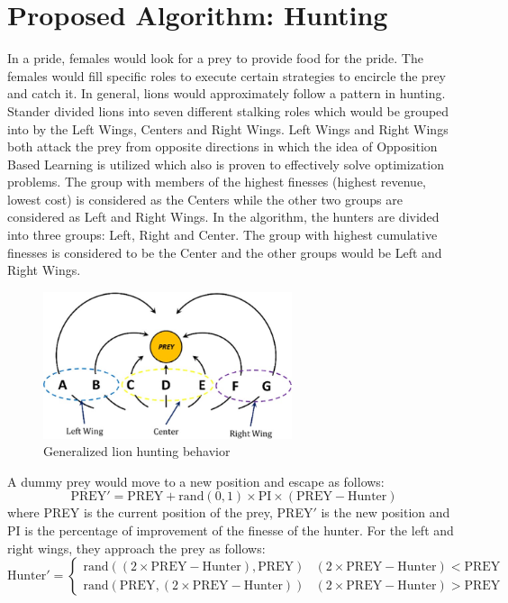 \section{Proposed Algorithm: Hunting}
In a pride, females would look for a prey to provide food for the pride. The females would fill specific roles to execute certain strategies to encircle the prey and catch it. In general, lions would approximately follow a pattern in hunting. Stander divided lions into seven different stalking roles which would be grouped into by the Left Wings, Centers and Right Wings.
Left Wings and Right Wings both attack the prey from opposite directions in which the idea of Opposition Based Learning is utilized which also is proven to effectively solve optimization problems.
The group with members of the highest finesses (highest revenue, lowest cost) is considered as the Centers while the other two groups are considered as Left and Right Wings.
In the algorithm, the hunters are divided into three groups: Left, Right and Center. The group with highest cumulative finesses is considered to be the Center and the other groups would be Left and Right Wings.
\begin{figure}[h]
\begin{center}
\includegraphics[width=0.65\textwidth]{img/pa/hunting_scheme}
\caption{Generalized lion hunting behavior}
\end{center}
\end{figure}
A dummy prey would move to a new position and escape as follows:
$$\text{PREY}' = \text{PREY} + \text{rand}(0,1) \times \text{PI} \times (\text{PREY} - \text{Hunter})$$
where PREY is the current position of the prey, PREY$'$ is the new position and PI is the percentage of improvement of the finesse of the hunter.
For the left and right wings, they approach the prey as follows:
\[ \text{Hunter}' =  \begin{cases} 
      \text{rand}((2 \times \text{PREY} - \text{Hunter}), \text{PREY}) & (2 \times \text{PREY} - \text{Hunter}) < \text{PREY} \\
      \text{rand}(\text{PREY}, (2 \times \text{PREY} - \text{Hunter})) & (2 \times \text{PREY} - \text{Hunter}) > \text{PREY}
   \end{cases}
\]
